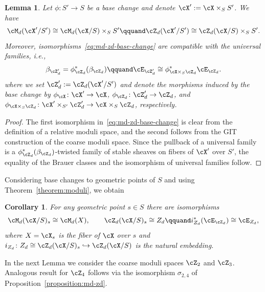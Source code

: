 \documentclass[11pt]{amsart}
\theoremstyle{plain}
\newtheorem{lemma}[theorem]{Lemma}
\newtheorem{corollary}[theorem]{Corollary}
\theoremstyle{definition}
\theoremstyle{remark}
\begin{document}
\begin{lemma}
\label{lemma:md-zd-base-change}
Let $\phi \colon S' \to S$ be a base change and denote $\cX' := \cX \times_S S'$.
We have
\begin{equation}
\label{eq:md-zd-base-change}
\cM_d(\cX'/S') \cong \cM_d(\cX/S) \times_S S'
\qquand
\cZ_d(\cX'/S') \cong \cZ_d(\cX/S) \times_S S'.
\end{equation} 
Moreover, isomorphisms~\eqref{eq:md-zd-base-change} are compatible with the universal families, i.e., 
\begin{equation}\label{eq:ced-base-change}
\beta_{\cZ'_d} = \phi_{\cZ_d}^*(\beta_{\cZ_d})
\qquand
\cE_{\cZ'_d} \cong \phi_{\cX \times_S \cZ_d}^*\cE_{\cZ_d}.
\end{equation}
where we set $\cZ'_d := \cZ_d(\cX'/S')$ and denote the morphisms induced by the base change
by $\phi_\cX \colon \cX' \to \cX$, $\phi_{\cZ_d} \colon \cZ'_d \to \cZ_d$, 
and $\phi_{\cX \times_S \cZ_d} \colon \cX' \times_{S'} \cZ'_d \to \cX \times_S \cZ_d$, respectively.
\end{lemma}
\begin{proof}
The first isomorphism in~\eqref{eq:md-zd-base-change} is clear from the definition of a relative moduli space, and the second follows from the GIT construction of the coarse moduli space.
Since the pullback of a universal family is a $\phi_{\cZ_d}^*(\beta_{\cZ_d})$-twisted family of stable sheaves on fibers of $\cX'$ over $S'$, the equality of the Brauer classes and 
the isomorphism of universal families follow.
\end{proof}

Considering base changes to geometric points of $S$ and using Theorem~\ref{theorem:moduli}, we obtain

\begin{corollary}
\label{corollary:S-s}
For any geometric point $s \in S$ there are isomorphisms
\begin{equation}
\label{eq:m-z-e-s}
\cM_d(\cX/S)_s \cong \cM_d(X),
\qquad
\cZ_d(\cX/S)_s \cong Z_d
\qquand
i_{Z_d}^*(\cE_{\cZ_d}) \cong \cE_{Z_d},
\end{equation}
where $X = \cX_s$ is the fiber of $\cX$ over $s$ and $i_{Z_d} \colon Z_d \cong \cZ_d(\cX/S)_s \hookrightarrow \cZ_d(\cX/S)$ 
is the natural embedding.
\end{corollary}



In the next Lemma we consider the coarse moduli spaces $\cZ_2$ and $\cZ_3$.
Analogous result for $\cZ_4$ follows via the isomorphism $\sigma_{2,4}$ of Proposition~\ref{proposition:md-zd}.
\end{document}
